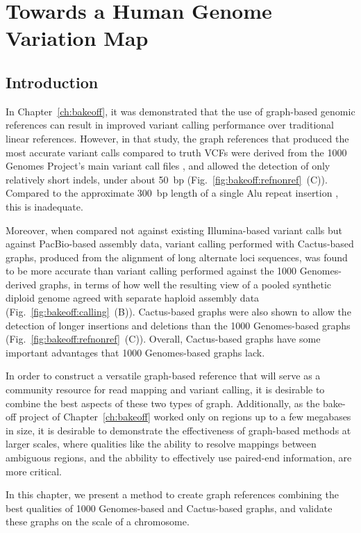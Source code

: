 \chapter{Towards a Human Genome Variation Map}
\label{ch:hgvm}

\section{Introduction}

In Chapter~\ref{ch:bakeoff}, it was demonstrated that the use of graph-based genomic references can result in improved variant calling performance over traditional linear references. However, in that study, the graph references that produced the most accurate variant calls compared to truth VCFs were derived from the 1000 Genomes Project's main variant call files \cite{10002015global}, and allowed the detection of only relatively short indels, under about 50~bp (Fig.~\ref{fig:bakeoff:refnonref}~(C)). Compared to the approximate 300~bp length of a single Alu repeat insertion \cite{weiner1980abundant}, this is inadequate.

Moreover, when compared not against existing Illumina-based variant calls but against PacBio-based assembly data, variant calling performed with Cactus-based graphs, produced from the alignment of long alternate loci sequences, was found to be more accurate than variant calling performed against the 1000 Genomes-derived graphs, in terms of how well the resulting view of a pooled synthetic diploid genome agreed with separate haploid assembly data (Fig.~\ref{fig:bakeoff:calling}~(B)). Cactus-based graphs were also shown to allow the detection of longer insertions and deletions than the 1000 Genomes-based graphs (Fig.~\ref{fig:bakeoff:refnonref}~(C)). Overall, Cactus-based graphs have some important advantages that 1000 Genomes-based graphs lack.

In order to construct a versatile graph-based reference that will serve as a community resource for read mapping and variant calling, it is desirable to combine the best aspects of these two types of graph. Additionally, as the bake-off project of Chapter~\ref{ch:bakeoff} worked only on regions up to a few megabases in size, it is desirable to demonstrate the effectiveness of graph-based methods at larger scales, where qualities like the ability to resolve mappings between ambiguous regions, and the abbility to effectively use paired-end information, are more critical.

In this chapter, we present a method to create graph references combining the best qualities of 1000 Genomes-based and Cactus-based graphs, and validate these graphs on the scale of a chromosome.

